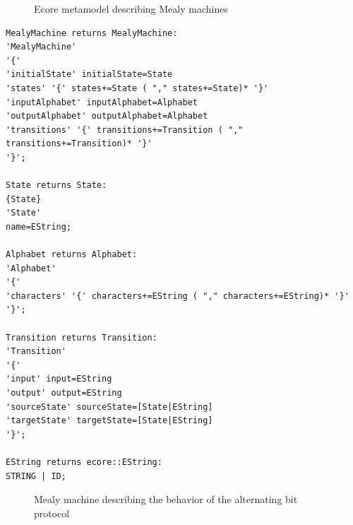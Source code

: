 \begin{figure}[!ht] 
	\centering
	\caption{Ecore metamodel describing Mealy machines} 
	\label{fig_appendix_mealyecor}
\end{figure}

\begin{lstlisting}[caption=Xtext grammar describing Mealy machines.,label=li:appendix_xtext,float,floatplacement=H]
MealyMachine returns MealyMachine:
'MealyMachine'
'{'
'initialState' initialState=State
'states' '{' states+=State ( "," states+=State)* '}' 
'inputAlphabet' inputAlphabet=Alphabet
'outputAlphabet' outputAlphabet=Alphabet
'transitions' '{' transitions+=Transition ( "," transitions+=Transition)* '}' 
'}';

State returns State:
{State}
'State'
name=EString;

Alphabet returns Alphabet:
'Alphabet'
'{'
'characters' '{' characters+=EString ( "," characters+=EString)* '}' 
'}';

Transition returns Transition:
'Transition'
'{'
'input' input=EString
'output' output=EString
'sourceState' sourceState=[State|EString]
'targetState' targetState=[State|EString]
'}';

EString returns ecore::EString:
STRING | ID;
\end{lstlisting}

\begin{figure}[!ht] 
	\centering
	\caption{Mealy machine describing the behavior of the alternating bit protocol} 
	\label{fig_alternatingbit}
\end{figure}